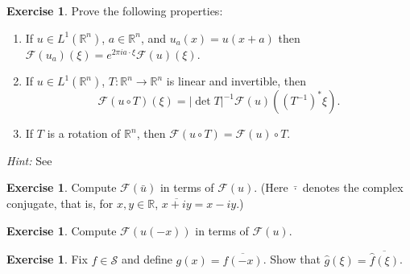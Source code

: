 \documentclass[a4paper,9pt]{amsart}
\newcommand{\scr}[1]{\mathscr{#1}}
\newcommand{\R}{\mathbb{R}}	%
\theoremstyle{plain}
\theoremstyle{definition}
\newtheorem{exercise}[proposition]{Exercise}%
\theoremstyle{remark}
\begin{document}
\begin{exercise}
	Prove the following properties:
	\begin{enumerate}
	\item
	If $u\in L^1(\R^n)$, $a\in\R^n$, and $u_a(x) = u(x+a)$
	then $\scr F(u_a)(\xi) = e^{2\pi i a\cdot \xi} \scr F(u)(\xi)$.
	\item
	If $u\in L^1(\R^n)$, $T:\R^n\to\R^n$ is linear and invertible, 
	then 
	\begin{equation}\label{eq67fccb0f}
		\scr F(u\circ T)(\xi) = |\det T|^{-1} \scr F(u)((T^{-1})^*\xi) .
	\end{equation}
	\item
	If $T$ is a rotation of $\R^n$, then $\scr F(u\circ T) = \scr F(u)\circ T$.
	\end{enumerate}
	{\it Hint:} See \cite[Proposition (0.21)]{MR1357411}
\end{exercise}

\begin{exercise}
	Compute $\scr F(\bar u)$ in terms of $\scr F(u)$.
	(Here $\bar\cdot$ denotes the complex conjugate, that is, for $x,y\in\R$, $ \overline{x+iy} = x-iy$.)
\end{exercise}

\begin{exercise}
	Compute $\scr F(u(-x))$ in terms of $\scr F(u)$.
\end{exercise}

\begin{exercise}\label{ex67fc118a}
	Fix $f\in\scr S$ and define $g(x) = \overline{f(-x)}$.
	Show that $\hat g (\xi) = \overline{\hat f(\xi)}$.
\end{exercise}
\end{document}
